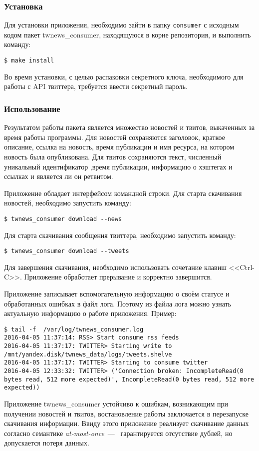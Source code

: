     \subsubsection{Установка}
        Для установки приложения, необходимо зайти в папку \lstinline{consumer} с исходным кодом пакет twnews\_consumer, находящуюся в корне репозитория, и выполнить команду:

        \begin{lstlisting}
$ make install
        \end{lstlisting}
        Во время установки, с целью распаковки секретного ключа, необходимого для работы с API твиттера, требуется ввести секретный пароль.

    \subsubsection{Использование}
        Результатом работы пакета является множество новостей и твитов, выкаченных за время работы программы.
        Для новостей сохраняются заголовок, краткое описание, ссылка на новость, время публикации и имя ресурса, на котором новость была опубликована.
        Для твитов сохраняются текст, численный уникальный идентификатор ,время публикации, информацию о хэштегах и ссылках и является ли он ретвитом.

        Приложение обладает интерфейсом командной строки.
        Для старта скачивания новостей, необходимо запустить команду:
        \begin{lstlisting}
$ twnews_consumer download --news
        \end{lstlisting}
        Для старта скачивания сообщения твиттера, необходимо запустить команду:
        \begin{lstlisting}
$ twnews_consumer download --tweets
        \end{lstlisting}
        Для завершения скачивания, необходимо использовать сочетание клавиш <<Ctrl-C>>.
        Приложение обработает прерывание и корректно завершится.

        Приложение записывает вспомогательную информацию о своём статусе и обработанных ошибках в файл лога.
        Поэтому из файла лога можно узнать актуальную информацию о работе приложения. Пример:
        \begin{lstlisting}
$ tail -f  /var/log/twnews_consumer.log
2016-04-05 11:37:14: RSS> Start consume rss feeds
2016-04-05 11:37:17: TWITTER> Starting write to /mnt/yandex.disk/twnews_data/logs/tweets.shelve
2016-04-05 11:37:17: TWITTER> Starting to consume twitter
2016-04-05 12:33:32: TWITTER> ('Connection broken: IncompleteRead(0 bytes read, 512 more expected)', IncompleteRead(0 bytes read, 512 more expected))
        \end{lstlisting}

        Приложение twnews\_consumer устойчиво к ошибкам, возникающим при получении новостей и твитов,
        востановление работы заключается в перезапуске скачивания информации.
        Ввиду этого приложение реализует скачивание данных согласно семантике \textit{at-most-once}~---~
        гарантируется отсутствие дублей, но допускается потеря данных.